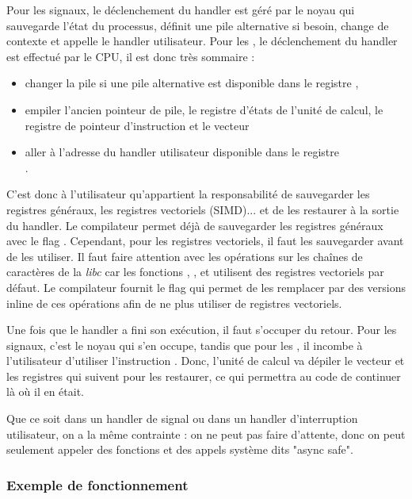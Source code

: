 Pour les signaux, le déclenchement du handler est géré par le noyau qui sauvegarde l'état du processus, définit une pile alternative si besoin, change de contexte et appelle le handler utilisateur.
Pour les \uintr{}, le déclenchement du handler est effectué par le CPU, il est donc très sommaire :
\begin{itemize}
  \item changer la pile si une pile alternative est disponible dans le registre ,
  \item empiler l'ancien pointeur de pile, le registre d'états de l'unité de calcul,
  le registre de pointeur d'instruction  et le vecteur \uintr{} %
  \item aller à l'adresse du handler utilisateur disponible dans le registre\\
  .
\end{itemize}
C'est donc à l'utilisateur qu'appartient la responsabilité de sauvegarder les registres généraux,
les registres vectoriels (SIMD)... et de les restaurer à la sortie du handler.
Le compilateur permet déjà de sauvegarder les registres généraux avec le flag .
Cependant, pour les registres vectoriels, il faut les sauvegarder avant de les utiliser.
Il faut faire attention avec les opérations sur les chaînes de caractères de la \emph{libc} car les
fonctions , ,  et  utilisent des registres vectoriels par défaut.
Le compilateur fournit le flag  qui permet de les remplacer par des versions inline
de ces opérations afin de ne plus utiliser de registres vectoriels. %

Une fois que le handler a fini son exécution, il faut s'occuper du retour.
Pour les signaux, c'est le noyau qui s'en occupe, tandis que pour les \uintr{},
il incombe à l'utilisateur d'utiliser l'instruction .
Donc, l'unité de calcul va dépiler le vecteur et les registres qui suivent pour les restaurer, ce qui permettra au code de continuer là où il en était.

Que ce soit dans un handler de signal ou dans un handler d'interruption utilisateur, on a la même contrainte :
on ne peut pas faire d'attente, donc on peut seulement appeler des fonctions et des appels système dits "async safe".

\subsubsection{Exemple de fonctionnement}
\label{sec:exemple}

